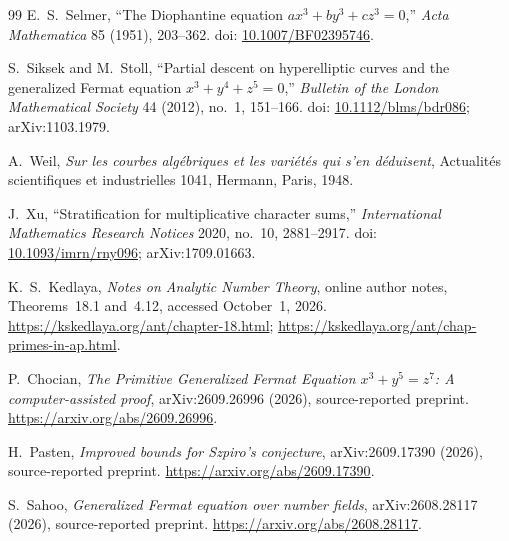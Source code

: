 \documentclass[11pt,a4paper]{article}
\begin{document}
\begin{thebibliography}{99}
E.~S.~Selmer, ``The Diophantine equation $ax^3+by^3+cz^3=0$,''
\emph{Acta Mathematica} 85 (1951), 203--362. doi:
\href{https://doi.org/10.1007/BF02395746}{10.1007/BF02395746}.

S.~Siksek and M.~Stoll, ``Partial descent on hyperelliptic curves
and the generalized Fermat equation $x^3+y^4+z^5=0$,''
\emph{Bulletin of the London Mathematical Society} 44 (2012),
no.\ 1, 151--166. doi:
\href{https://doi.org/10.1112/blms/bdr086}{10.1112/blms/bdr086};
arXiv:1103.1979.

A.~Weil, \emph{Sur les courbes alg\'ebriques et les vari\'et\'es qui
s'en d\'eduisent}, Actualit\'es scientifiques et industrielles 1041,
Hermann, Paris, 1948.

J.~Xu, ``Stratification for multiplicative character sums,''
\emph{International Mathematics Research Notices} 2020, no.\ 10,
2881--2917. doi:
\href{https://doi.org/10.1093/imrn/rny096}{10.1093/imrn/rny096};
arXiv:1709.01663.

K.~S.~Kedlaya, \emph{Notes on Analytic Number Theory},
online author notes, Theorems~18.1 and~4.12, accessed October~1, 2026.
\url{https://kskedlaya.org/ant/chapter-18.html};
\url{https://kskedlaya.org/ant/chap-primes-in-ap.html}.

P.~Chocian, \emph{The Primitive Generalized Fermat Equation
$x^3+y^5=z^7$: A computer-assisted proof},
arXiv:2609.26996 (2026), source-reported preprint.
\url{https://arxiv.org/abs/2609.26996}.

H.~Pasten, \emph{Improved bounds for Szpiro's conjecture},
arXiv:2609.17390 (2026), source-reported preprint.
\url{https://arxiv.org/abs/2609.17390}.

S.~Sahoo, \emph{Generalized Fermat equation over number fields},
arXiv:2608.28117 (2026), source-reported preprint.
\url{https://arxiv.org/abs/2608.28117}.

\end{thebibliography}
\endgroup
\end{document}
